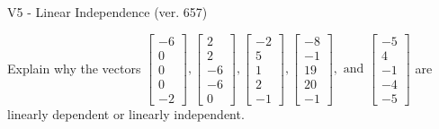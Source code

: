 \begin{exercise}
  \begin{exerciseTitle}V5 - Linear Independence (ver. 657)\end{exerciseTitle}
  \begin{exerciseStatement}
    Explain why the vectors \(\left[\begin{array}{r}
-6 \\
0 \\
0 \\
0 \\
-2
\end{array}\right] , \left[\begin{array}{r}
2 \\
2 \\
-6 \\
-6 \\
0
\end{array}\right] , \left[\begin{array}{r}
-2 \\
5 \\
1 \\
2 \\
-1
\end{array}\right] , \left[\begin{array}{r}
-8 \\
-1 \\
19 \\
20 \\
-1
\end{array}\right] , \text{ and } \left[\begin{array}{r}
-5 \\
4 \\
-1 \\
-4 \\
-5
\end{array}\right]\) are linearly dependent or linearly independent.	



\end{exerciseStatement}
\end{exercise}
